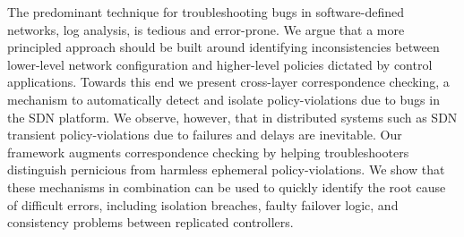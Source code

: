 The predominant technique for troubleshooting bugs in software-defined networks,
log analysis, is tedious and error-prone. We argue that a more principled
approach should be built around identifying inconsistencies between lower-level
network configuration and higher-level policies dictated by control
applications. Towards this end we present
cross-layer correspondence checking, a mechanism to automatically detect and
isolate policy-violations due to bugs in the SDN platform. We observe,
however, that in
distributed systems such as SDN 
transient policy-violations due to failures and delays are inevitable.
Our \simulator{} framework augments correspondence checking by helping troubleshooters
distinguish pernicious from harmless ephemeral policy-violations.
We show that these mechanisms in combination can be used to quickly
identify the root cause of difficult errors, including isolation breaches,
faulty failover logic, and consistency problems between replicated
controllers.

